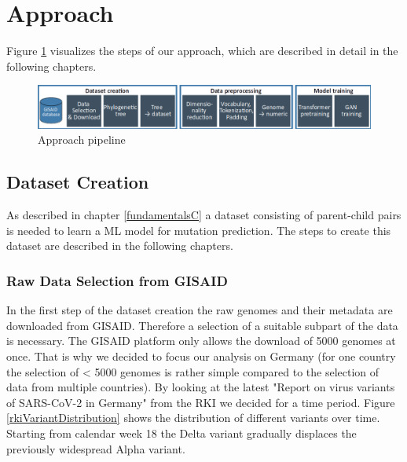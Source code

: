 \section{Approach} 
\label{approach}

Figure \ref{pipeline} visualizes the steps of our approach, which are described in detail in the following chapters.

\begin{figure}[ht]
	\centering
	\includegraphics[width=1.0\linewidth]{figures/pipeline.png}
	\caption{Approach pipeline \cite{own representation}}
	\label{pipeline}
\end{figure}


\subsection{Dataset Creation} \label{approachA}

As described in chapter \ref{fundamentalsC} a dataset consisting of parent-child pairs is needed to learn a \ac{ML} model for mutation prediction. The steps to create this dataset are described in the following chapters.

\subsubsection{Raw Data Selection from \ac{GISAID}} \label{approachAa}

In the first step of the dataset creation the raw genomes and their metadata are downloaded from \ac{GISAID}. Therefore a selection of a suitable subpart of the data is necessary. The \ac{GISAID} platform only allows the download of 5000 genomes at once. That is why we decided to focus our analysis on Germany (for one country the selection of < 5000 genomes is rather simple compared to the selection of data from multiple countries). By looking at the latest "Report on virus variants of SARS-CoV-2 in Germany" from the \ac{RKI} we decided for a time period. Figure \ref{rkiVariantDistribution} shows the distribution of different variants over time. Starting from calendar week 18 the Delta variant gradually displaces the previously widespread Alpha variant.

